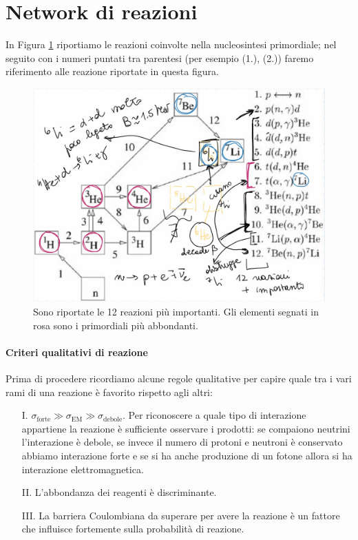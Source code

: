 \section{Network di reazioni}
In Figura \ref{0315_net} riportiamo le reazioni coinvolte nella nucleosintesi primordiale; nel seguito con i numeri puntati tra parentesi (per esempio (1.), (2.)) faremo riferimento alle reazione riportate in questa figura.
\begin{figure}[h]
    \centering
    \includegraphics[scale=0.25]{Immagini/0315_network.png}
    \caption{Sono riportate le 12 reazioni più importanti. Gli elementi segnati in rosa sono i primordiali più abbondanti.}
    \label{0315_net}
\end{figure}

\paragraph{Criteri qualitativi di reazione} Prima di procedere ricordiamo alcune regole qualitative per capire quale tra i vari rami di una reazione è favorito rispetto agli altri:
\begin{itemize}
    \item[I.] $\sigma_\text{forte}\gg\sigma_\text{EM}\gg\sigma_\text{debole}$. Per riconoscere a quale tipo di interazione appartiene la reazione è sufficiente osservare i prodotti: se compaiono neutrini l'interazione è debole, se invece il numero di protoni e neutroni è conservato abbiamo interazione forte e se si ha anche produzione di un fotone allora si ha interazione elettromagnetica.
    \item[II.] L'abbondanza dei reagenti è discriminante.
    \item[III.] La barriera Coulombiana da superare per avere la reazione è un fattore che influisce fortemente sulla probabilità di reazione.
\end{itemize}

